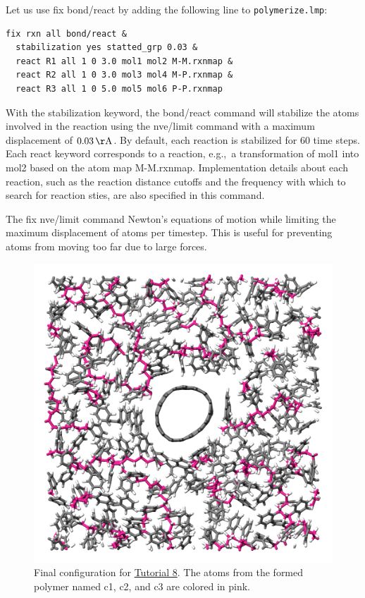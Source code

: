 \documentclass[9pt,tutorial]{livecoms}
\newcommand{\lmpcmd}[1]{\hspace{0pt}\colorbox{listing}{\textcolor{command}{\small{#1}}}\hspace{0pt}} %
\newcommand{\flecmd}[1]{\textcolor{command}{\texttt{#1}}} %
\begin{document}
Let us use \lmpcmd{fix bond/react} by adding the following
line to \flecmd{polymerize.lmp}:
\begin{lstlisting}
fix rxn all bond/react &
  stabilization yes statted_grp 0.03 &
  react R1 all 1 0 3.0 mol1 mol2 M-M.rxnmap &
  react R2 all 1 0 3.0 mol3 mol4 M-P.rxnmap &
  react R3 all 1 0 5.0 mol5 mol6 P-P.rxnmap
\end{lstlisting}
With the \lmpcmd{stabilization} keyword, the \lmpcmd{bond/react} command will
stabilize the atoms involved in the reaction using the \lmpcmd{nve/limit}
command with a maximum displacement of $0.03\,\mathrm{\AA{}}$.  By default,
each reaction is stabilized for 60 time steps.  Each \lmpcmd{react} keyword
corresponds to a reaction, e.g.,~a transformation of \lmpcmd{mol1} into \lmpcmd{mol2}
based on the atom map \lmpcmd{M-M.rxnmap}.  Implementation details about each reaction,
such as the reaction distance cutoffs and the frequency with which to search for
reaction sties, are also specified in this command.

\begin{note}
{\color{blue}The \lmpcmd{fix nve/limit} command Newton's equations of motion
while limiting the maximum displacement of atoms per timestep.  This is
useful for preventing atoms from moving too far due to large forces.}
\end{note}

\begin{figure}
\centering
\includegraphics[width=\linewidth]{REACT-final.png}
\caption{Final configuration for \hyperref[bond-react-label]{Tutorial 8}.
The atoms from the formed polymer named \lmpcmd{c1}, \lmpcmd{c2}, and
\lmpcmd{c3} are colored in pink.}
\label{fig:REACT-final}
\end{figure}
\end{document}
